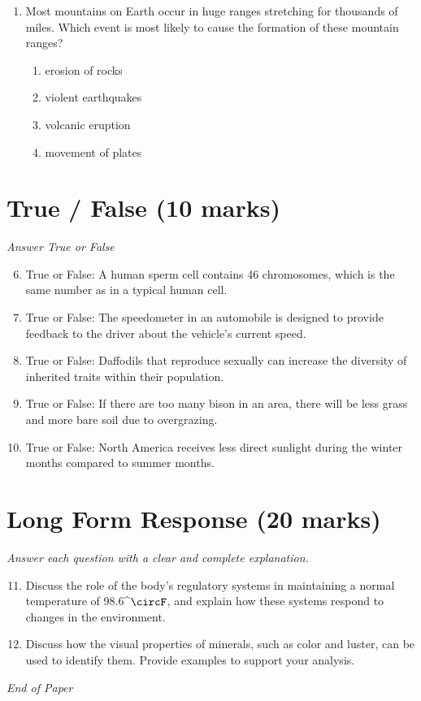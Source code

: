 \documentclass[12pt]{article}
\begin{document}
\begin{enumerate}[label=\arabic*.]
\begin{enumerate}[label=(\alph*)]
    \item a measuring cup
    \item a balance
    \item a magnifying glass
\end{enumerate}
\item Most mountains on Earth occur in huge ranges stretching for thousands of miles. Which event is most likely to cause the formation of these mountain ranges?
\begin{enumerate}[label=(\alph*)]
    \item erosion of rocks
    \item violent earthquakes
    \item volcanic eruption
    \item movement of plates
\end{enumerate}
\end{enumerate}

\section*{True / False (10 marks)}
\textit{Answer True or False}
\begin{enumerate}[label=\arabic*.]
\setcounter{enumi}{5}
\item True or False: A human sperm cell contains 46 chromosomes, which is the same number as in a typical human cell.
\item True or False: The speedometer in an automobile is designed to provide feedback to the driver about the vehicle's current speed.
\item True or False: Daffodils that reproduce sexually can increase the diversity of inherited traits within their population.
\item True or False: If there are too many bison in an area, there will be less grass and more bare soil due to overgrazing.
\item True or False: North America receives less direct sunlight during the winter months compared to summer months.
\end{enumerate}

\section*{Long Form Response (20 marks)}
\textit{Answer each question with a clear and complete explanation.}
\begin{enumerate}[label=\arabic*.]
\setcounter{enumi}{10}
\item Discuss the role of the body's regulatory systems in maintaining a normal temperature of 98.6^\ensuremath{\circF}, and explain how these systems respond to changes in the environment.
\item Discuss how the visual properties of minerals, such as color and luster, can be used to identify them. Provide examples to support your analysis.
\end{enumerate}

\vfill
\noindent\textit{End of Paper}
\end{document}
